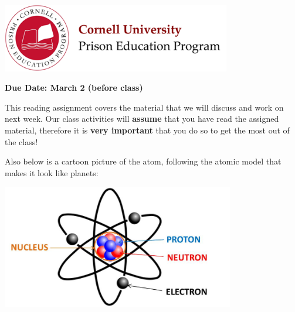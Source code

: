 \documentclass[addpoints,12pt]{exam}
\begin{document}

\begin{flushright}
\vspace{0.2in}

\end{flushright}

\begin{center}
\includegraphics[width=10cm]{../images/logo.png}
\end{center}

\begin{center}
\end{center}

\noindent\begin{large}\textbf{Due Date: March 2 (before class)}\end{large}
\vspace{0.2in}

This reading assignment covers the material that we will discuss and work on next week. Our class activities will \textbf{assume} that you have read the assigned material, therefore it is \textbf{very important} that you do so to get the most out of the class!

Also below is a cartoon picture of the atom, following the atomic model that makes it look like planets:

\noindent \begin{center}\includegraphics[width=4in]{../images/atom.jpg}\end{center}
\end{document}
